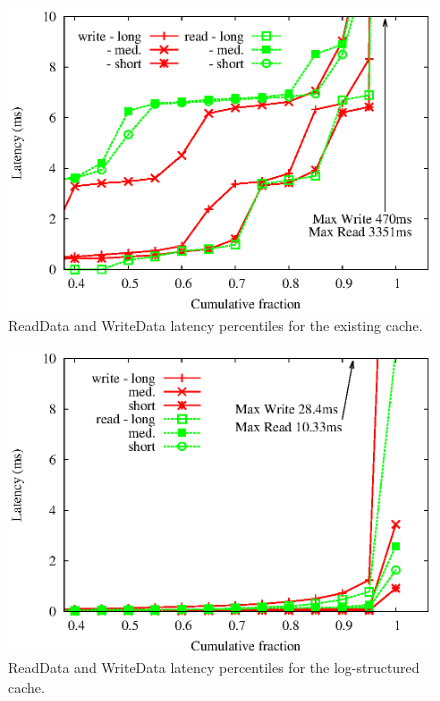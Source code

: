 \documentclass[letterpaper,twocolumn,10pt]{article}
\begin{document}
\begin{figure}[t]
  \begin{center}
    \includegraphics[width=1.04\columnwidth]{data/disk-perf}
  \end{center}
  \caption{ReadData and WriteData latency percentiles for the existing cache.}
  \label{fig:disk-perf} 
\vspace{-0.2in}
\end{figure}

\begin{figure}[t]
  \begin{center}
    \includegraphics[width=1.04\columnwidth]{data/flash-perf}
  \end{center}
  \caption{ReadData and WriteData latency percentiles for the log-structured
    cache.}
  \label{fig:flash-perf} 
\vspace{-0.2in}
\end{figure}
\end{document}
